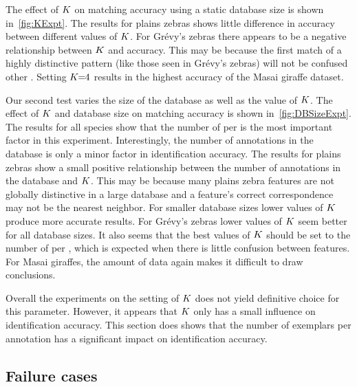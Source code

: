         The effect of $K$ on matching accuracy using a static database size is shown in~\cref{fig:KExpt}.
        The results for plains zebras shows little difference in accuracy between different values of $K$.
        For Grévy's zebras there appears to be a negative relationship between $K$ and accuracy.
        This may be because the first match of a highly distinctive pattern (like those seen in Grévy's zebras)
          will not be confused other \names{}.
        Setting $K\mkern-6mu=\mkern-6mu4$ results in the highest accuracy of the Masai giraffe dataset.

        \KExpt{}
        
        Our second test varies the size of the database as well as the value of $K$.
        The effect of $K$ and database size on matching accuracy is shown in~\cref{fig:DBSizeExpt}.
        The results for all species show that the number of \exemplars{} per \name{} is the most important factor
          in this experiment.
        Interestingly, the number of annotations in the database is only a minor factor in identification
          accuracy.
        The results for plains zebras show a small positive relationship between the number of annotations in the
          database and $K$.
        This may be because many plains zebra features are not globally distinctive in a large database and a
          feature's correct correspondence may not be the nearest neighbor.
        For smaller database sizes lower values of $K$ produce more accurate results.
        For Grévy's zebras lower values of $K$ seem better for all database sizes.
        It also seems that the best values of $K$ should be set to the number of \exemplars{} per \name{}, which
          is expected when there is little confusion between features.
        For Masai giraffes, the amount of data again makes it difficult to draw conclusions.

        \DBSizeExpt{}

        Overall the experiments on the setting of $K$ does not yield definitive choice for this parameter.
        However, it appears that $K$ only has a small influence on identification accuracy.
        This section does shows that the number of exemplars per annotation has a significant impact on
          identification accuracy.

    \subsection{Failure cases}\label{sub:exptfail}  
        
